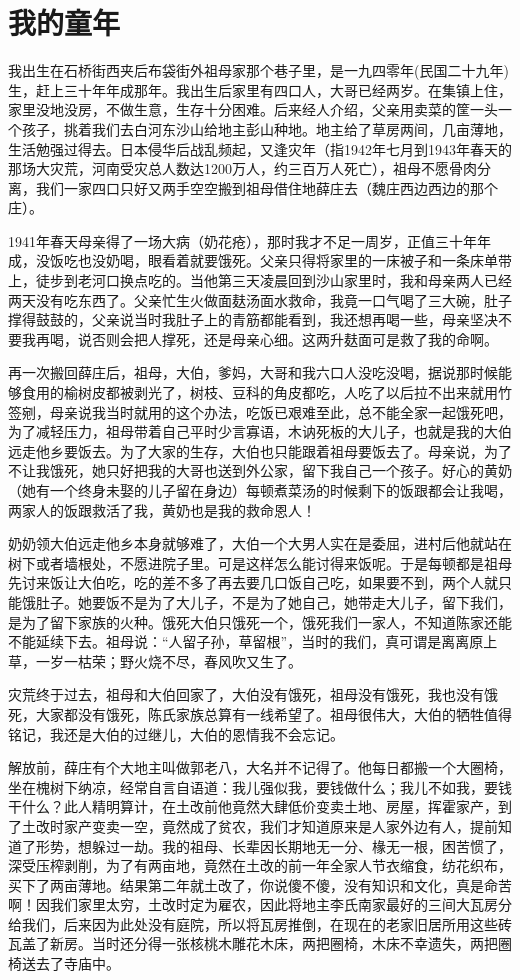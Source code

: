 \chapter{我的童年}

我出生在石桥街西夹后布袋街外祖母家那个巷子里，是一九四零年(民国二十九年)生，赶上三十年年成那年。我出生后家里有四口人，大哥已经两岁。在集镇上住，家里没地没房，不做生意，生存十分困难。后来经人介绍，父亲用卖菜的筐一头一个孩子，挑着我们去白河东沙山给地主彭山种地。地主给了草房两间，几亩薄地，生活勉强过得去。日本侵华后战乱频起，又逢灾年（指1942年七月到1943年春天的那场大灾荒，河南受灾总人数达1200万人，约三百万人死亡），祖母不愿骨肉分离，我们一家四口只好又两手空空搬到祖母借住地薛庄去（魏庄西边西边的那个庄）。

1941年春天母亲得了一场大病（奶花疮），那时我才不足一周岁，正值三十年年成，没饭吃也没奶喝，眼看着就要饿死。父亲只得将家里的一床被子和一条床单带上，徒步到老河口换点吃的。当他第三天凌晨回到沙山家里时，我和母亲两人已经两天没有吃东西了。父亲忙生火做面麸汤面水救命，我竟一口气喝了三大碗，肚子撑得鼓鼓的，父亲说当时我肚子上的青筋都能看到，我还想再喝一些，母亲坚决不要我再喝，说否则会把人撑死，还是母亲心细。这两升麸面可是救了我的命啊。

再一次搬回薛庄后，祖母，大伯，爹妈，大哥和我六口人没吃没喝，据说那时候能够食用的榆树皮都被剥光了，树枝、豆科的角皮都吃，人吃了以后拉不出来就用竹签剜，母亲说我当时就用的这个办法，吃饭已艰难至此，总不能全家一起饿死吧，为了减轻压力，祖母带着自己平时少言寡语，木讷死板的大儿子，也就是我的大伯远走他乡要饭去。为了大家的生存，大伯也只能跟着祖母要饭去了。母亲说，为了不让我饿死，她只好把我的大哥也送到外公家，留下我自己一个孩子。好心的黄奶（她有一个终身未娶的儿子留在身边）每顿煮菜汤的时候剩下的饭跟都会让我喝，两家人的饭跟救活了我，黄奶也是我的救命恩人！

奶奶领大伯远走他乡本身就够难了，大伯一个大男人实在是委屈，进村后他就站在树下或者墙根处，不愿进院子里。可是这样怎么能讨得来饭呢。于是每顿都是祖母先讨来饭让大伯吃，吃的差不多了再去要几口饭自己吃，如果要不到，两个人就只能饿肚子。她要饭不是为了大儿子，不是为了她自己，她带走大儿子，留下我们，是为了留下家族的火种。饿死大伯只饿死一个，饿死我们一家人，不知道陈家还能不能延续下去。祖母说：“人留子孙，草留根”，当时的我们，真可谓是离离原上草，一岁一枯荣；野火烧不尽，春风吹又生了。

灾荒终于过去，祖母和大伯回家了，大伯没有饿死，祖母没有饿死，我也没有饿死，大家都没有饿死，陈氏家族总算有一线希望了。祖母很伟大，大伯的牺牲值得铭记，我还是大伯的过继儿，大伯的恩情我不会忘记。

解放前，薛庄有个大地主叫做郭老八，大名并不记得了。他每日都搬一个大圈椅，坐在槐树下纳凉，经常自言自语道：我儿强似我，要钱做什么；我儿不如我，要钱干什么？此人精明算计，在土改前他竟然大肆低价变卖土地、房屋，挥霍家产，到了土改时家产变卖一空，竟然成了贫农，我们才知道原来是人家外边有人，提前知道了形势，想躲过一劫。我的祖母、长辈因长期地无一分、椽无一根，困苦惯了，深受压榨剥削，为了有两亩地，竟然在土改的前一年全家人节衣缩食，纺花织布，买下了两亩薄地。结果第二年就土改了，你说傻不傻，没有知识和文化，真是命苦啊！因我们家里太穷，土改时定为雇农，因此将地主李氏南家最好的三间大瓦房分给我们，后来因为此处没有庭院，所以将瓦房推倒，在现在的老家旧居所用这些砖瓦盖了新房。当时还分得一张核桃木雕花木床，两把圈椅，木床不幸遗失，两把圈椅送去了寺庙中。

